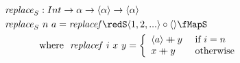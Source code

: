\documentclass[preview]{standalone}
\begin{document}
\begin{align*}
  \mathit{replace}_S &: Int \rightarrow \alpha \rightarrow \vect{\alpha} \rightarrow \vect{\alpha} \\
  \mathit{replace}_S &\ n\ a = \mathit{replacef} \redS \vect{1,2,...} \circ \vect{} \fMapS\\
         & \text{where}\ \ \mathit{replacef}\ i\ x\ y = 
           \left\{\begin{array}{ll}
                    \vect{a} \fcat y & \text{ if } i = n\\
                    x \fcat y & \text{ otherwise}
                  \end{array}
           \right.\\
\end{align*}
\end{document}
